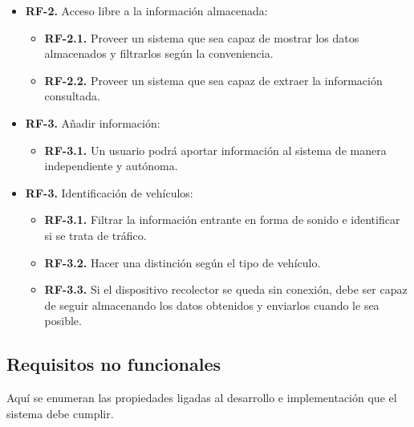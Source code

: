 \begin{itemize}
  \item \textbf{RF-2.} Acceso libre a la información almacenada:
    \begin{itemize}
      \item \textbf{RF-2.1.} Proveer un sistema que sea capaz de mostrar los datos almacenados y filtrarlos según la conveniencia.
      \item \textbf{RF-2.2.} Proveer un sistema que sea capaz de extraer la información consultada.
    \end{itemize}
\end{itemize}

\begin{itemize}
  \item \textbf{RF-3.} Añadir información:
    \begin{itemize}
    \item \textbf{RF-3.1.} Un usuario podrá aportar información al sistema de manera independiente y autónoma.
  \end{itemize}
\end{itemize}

\begin{itemize}
  \item \textbf{RF-3.} Identificación de vehículos:
    \begin{itemize}
    \item \textbf{RF-3.1.} Filtrar la información entrante en forma de sonido e identificar si se trata de tráfico.
    \item \textbf{RF-3.2.} Hacer una distinción según el tipo de vehículo.
    \item \textbf{RF-3.3.} Si el dispositivo recolector se queda sin conexión, debe ser capaz de seguir almacenando los datos obtenidos y enviarlos cuando le sea posible.
    \end{itemize}
\end{itemize}


\subsection{Requisitos no funcionales}

Aquí se enumeran las propiedades ligadas al desarrollo e implementación que el sistema debe cumplir.

